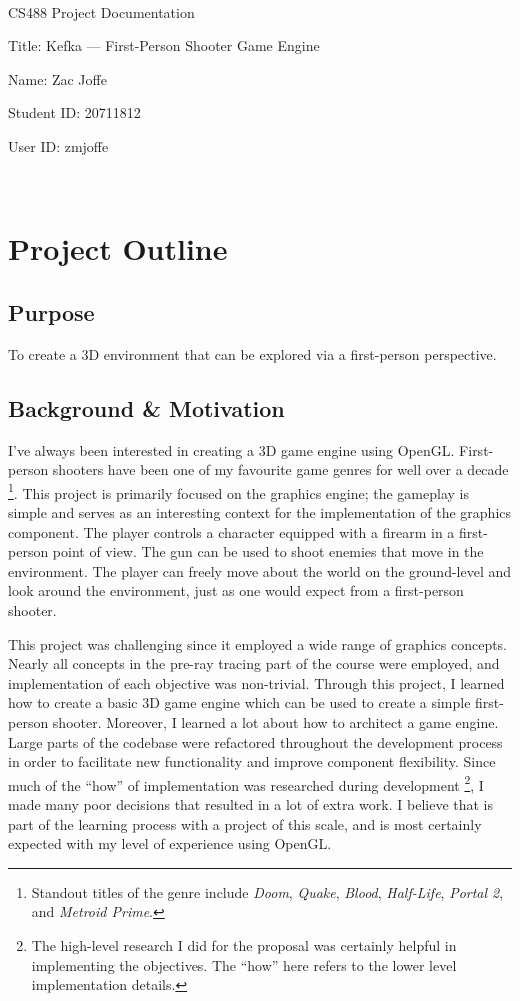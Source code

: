 \documentclass {article}
\begin{document}
~\vfill
\begin{center}
\Large

CS488 Project Documentation

Title: Kefka --- First-Person Shooter Game Engine

Name: Zac Joffe

Student ID: 20711812

User ID: zmjoffe

\end{center}
\vfill ~\vfill~

\newpage
\tableofcontents

\newpage
\section{Project Outline}
\subsection{Purpose}
To create a 3D environment that can be explored via a first-person perspective.

\subsection{Background \& Motivation}\label{sec:background}
I've always been interested in creating a 3D game engine using OpenGL. First-person shooters have been one of my favourite game genres for well over a decade \footnote{Standout titles of the genre include \textit{Doom}, \textit{Quake}, \textit{Blood}, \textit{Half-Life}, \textit{Portal 2}, and \textit{Metroid Prime}.}. This project is primarily focused on the graphics engine; the gameplay is simple and serves as an interesting context for the implementation of the graphics component. The player controls a character equipped with a firearm in a first-person point of view. The gun can be used to shoot enemies that move in the environment. The player can freely move about the world on the ground-level and look around the environment, just as one would expect from a first-person shooter.

This project was challenging since it employed a wide range of graphics concepts. Nearly all concepts in the pre-ray tracing part of the course were employed, and implementation of each objective was non-trivial. Through this project, I learned how to create a basic 3D game engine which can be used to create a simple first-person shooter. Moreover, I learned a lot about how to architect a game engine. Large parts of the codebase were refactored throughout the development process in order to facilitate new functionality and improve component flexibility. Since much of the ``how'' of implementation was researched during development \footnote{The high-level research I did for the proposal was certainly helpful in implementing the objectives. The ``how'' here refers to the lower level implementation details.}, I made many poor decisions that resulted in a lot of extra work. I believe that is part of the learning process with a project of this scale, and is most certainly expected with my level of experience using OpenGL.
\end{document}
